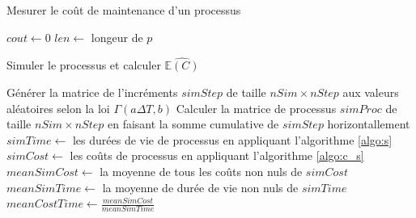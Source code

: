 \documentclass[10pt,a4paper]{article}
\begin{document}
\begin{algorithm}[!h]
    \caption{Mesurer le coût de maintenance d'un processus}
    \label{algo:c_s}
    $cout \leftarrow 0$\;
    $len \leftarrow $ longeur de $p$\;
\end{algorithm}

\begin{algorithm}[!h]
    \caption{Simuler le processus et calculer $\widehat{\mathbb{E}(C)}$}
    \label{algo:e_c}
    Générer la matrice de l'incréments $simStep$ de taille $nSim \times nStep$ aux valeurs aléatoires selon la loi $\Gamma(a\Delta T, b)$\;
    Calculer la matrice de processus $simProc$ de taille $nSim \times nStep$ en faisant la somme cumulative de $simStep$ horizontallement\;
    $simTime \leftarrow$ les durées de vie de processus en appliquant l'algorithme \eqref{algo:s}\;
    $simCost \leftarrow$ les coûts de processus en appliquant l'algorithme \eqref{algo:c_s}\;
    $meanSimCost \leftarrow$ la moyenne de tous les coûts non nuls de $simCost$\;
    $meanSimTime \leftarrow$ la moyenne de durée de vie non nuls de $simTime$\;
    $meanCostTime \leftarrow \frac{meanSimCost}{meanSimTime}$\;
\end{algorithm}
\end{document}
